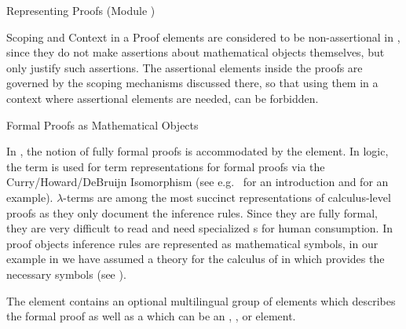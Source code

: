 \begin{tchapter}[id=proofs,short=Representing Proofs]{Representing Proofs (Module {})}
\begin{tsection}[id=proofs:scoping]{Scoping and Context in a Proof}
{} elements are considered to be
non-assertional in {\omdoc}, since they do not make
assertions about mathematical objects themselves, but only justify such assertions.
The assertional elements inside the proofs are governed by the scoping mechanisms
discussed there, so that using them in a context where assertional elements are
needed, can be forbidden. 
\end{tsection}

\begin{tsection}[id=proofobjects]{Formal Proofs as Mathematical Objects}
  
  In {\omdoc}, the notion of fully formal proofs is accommodated by the
  {} element. In logic, the term {} is used for
  term representations for formal proofs via the Curry/Howard/DeBruijn Isomorphism (see
  e.g.~\cite{Thompson91} for an introduction and {} for an example).
  $\lambda$-terms are among the most succinct representations of calculus-level proofs as
  they only document the inference rules. Since they are fully formal, they are very
  difficult to read and need specialized {s} for
  human consumption. In proof objects inference rules are represented as mathematical
  symbols, in our example in {} we have assumed a theory
  {} for the calculus of {} in
  {} which provides the necessary symbols (see
  {}).
  
  The {} element contains an optional multilingual group of
  {} elements which describes the formal proof as well as a
  {} which can be an {},
  {}, or {} element.


\end{tsection}
\end{tchapter}
